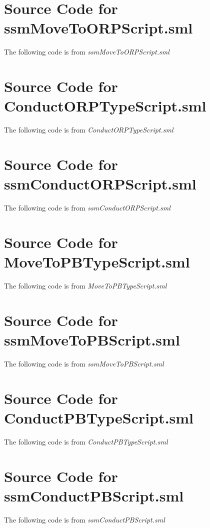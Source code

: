 \chapter{Source Code for ssmMoveToORPScript.sml}
\label{cha:source-code-ssmm}
The following code is from \emph{ssmMoveToORPScript.sml}


\chapter{Source Code for ConductORPTypeScript.sml}
\label{cha:source-code-cond}
The following code is from \emph{ConductORPTypeScript.sml}


\chapter{Source Code for ssmConductORPScript.sml}
\label{cha:source-code-ssmc}
The following code is from \emph{ssmConductORPScript.sml}


\chapter{Source Code for MoveToPBTypeScript.sml}
\label{cha:source-code-movet-1}
The following code is from \emph{MoveToPBTypeScript.sml}


\chapter{Source Code for ssmMoveToPBScript.sml}
\label{cha:source-code-ssmm-1}
The following code is from \emph{ssmMoveToPBScript.sml}


\chapter{Source Code for ConductPBTypeScript.sml}
\label{cha:source-code-cond-1}
The following code is from \emph{ConductPBTypeScript.sml}


\chapter{Source Code for ssmConductPBScript.sml}
\label{cha:source-code-ssmc-1}
The following code is from \emph{ssmConductPBScript.sml}


